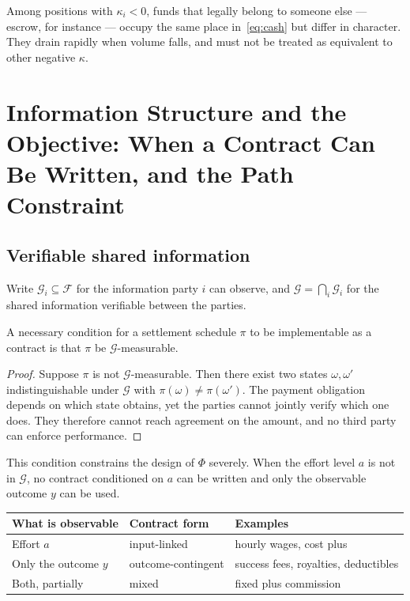 \begin{remark}
Among positions with $\kappa_i<0$, funds that legally belong to someone else --- escrow, for
instance --- occupy the same place in~\eqref{eq:cash} but differ in character. They drain
rapidly when volume falls, and must not be treated as equivalent to other negative $\kappa$.
\end{remark}

\chapter[Information Structure and the Objective]{Information Structure and the Objective: When a Contract Can Be Written, and the Path Constraint}
\label{sec:info}

\section{Verifiable shared information}
\label{sec:verifiable}

Write $\mathcal{G}_i\subseteq\mathcal{F}$ for the information party $i$ can observe, and
$\mathcal{G}=\bigcap_i \mathcal{G}_i$ for the shared information verifiable between the
parties.

\begin{proposition}[Implementability]
\label{prop:implementable}
A necessary condition for a settlement schedule $\pi$ to be implementable as a contract is
that $\pi$ be $\mathcal{G}$-measurable.
\end{proposition}

\begin{proof}
Suppose $\pi$ is not $\mathcal{G}$-measurable. Then there exist two states $\omega,\omega'$
indistinguishable under $\mathcal{G}$ with $\pi(\omega)\neq\pi(\omega')$. The payment
obligation depends on which state obtains, yet the parties cannot jointly verify which one
does. They therefore cannot reach agreement on the amount, and no third party can enforce
performance.
\end{proof}

This condition constrains the design of $\Phi$ severely. When the effort level $a$ is not in
$\mathcal{G}$, no contract conditioned on $a$ can be written and only the observable outcome
$y$ can be used.

\begin{center}
\begin{tabularx}{\textwidth}{@{}llX@{}}
\toprule
What is observable & Contract form & Examples \\
\midrule
Effort $a$ & input-linked & hourly wages, cost plus \\
Only the outcome $y$ & outcome-contingent & success fees, royalties, deductibles \\
Both, partially & mixed & fixed plus commission \\
\bottomrule
\end{tabularx}
\label{tab:observability-contracts}
\end{center}

